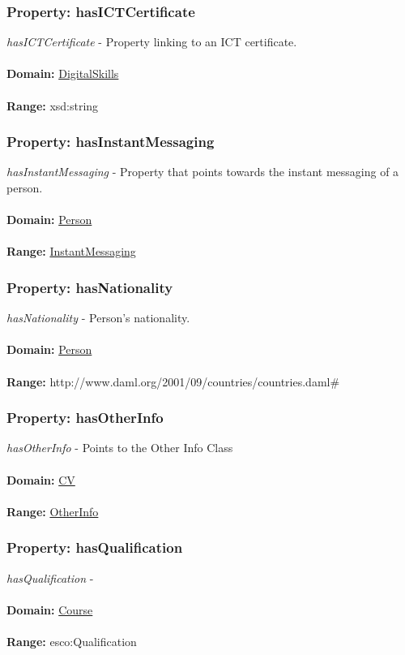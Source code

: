 \documentclass[a4paper,12pt]{article}
\numberwithin{equation}{section}
\begin{document}
\subsubsection{Property: hasICTCertificate}\hypertarget{hasICTCertificate}{}
\textit{hasICTCertificate} - Property linking to an ICT certificate.
\\\\
\textbf{Domain:} \hyperlink{DigitalSkills}{DigitalSkills} 
\\\\
\textbf{Range:}  xsd:string

\subsubsection{Property: hasInstantMessaging}\hypertarget{hasInstantMessaging}{}
\textit{hasInstantMessaging} - Property that points towards the instant messaging of a person.
\\\\
\textbf{Domain:} \hyperlink{Person}{Person} 
\\\\
\textbf{Range:}  \hyperlink{InstantMessaging}{InstantMessaging} 

\subsubsection{Property: hasNationality}\hypertarget{hasNationality}{}
\textit{hasNationality} - Person's nationality.
\\\\
\textbf{Domain:} \hyperlink{Person}{Person} 
\\\\
\textbf{Range:}  http://www.daml.org/2001/09/countries/countries.daml\#

\subsubsection{Property: hasOtherInfo}\hypertarget{hasOtherInfo}{}
\textit{hasOtherInfo} - Points to the Other Info Class
\\\\
\textbf{Domain:} \hyperlink{CV}{CV} 
\\\\
\textbf{Range:}  \hyperlink{OtherInfo}{OtherInfo} 

\subsubsection{Property: hasQualification}\hypertarget{hasQualification}{}
\textit{hasQualification} -
\\\\
\textbf{Domain:} \hyperlink{Course}{Course} 
\\\\
\textbf{Range:}  esco:Qualification
\end{document}
